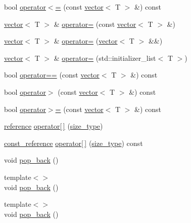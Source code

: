 \begin{DoxyCompactItemize}
\item 
bool \mbox{\hyperlink{classvector_a760a0ad79cdf6a459e2641ddb9a54c3a}{operator$<$=}} (const \mbox{\hyperlink{classvector}{vector}}$<$ T $>$ \&) const
\item 
\mbox{\hyperlink{classvector}{vector}}$<$ T $>$ \& \mbox{\hyperlink{classvector_ab0f8c3adc54f26c30db3a913daed81af}{operator=}} (const \mbox{\hyperlink{classvector}{vector}}$<$ T $>$ \&)
\item 
\mbox{\hyperlink{classvector}{vector}}$<$ T $>$ \& \mbox{\hyperlink{classvector_aa2bf38f1f948638605444ce95d16a663}{operator=}} (\mbox{\hyperlink{classvector}{vector}}$<$ T $>$ \&\&)
\item 
\mbox{\hyperlink{classvector}{vector}}$<$ T $>$ \& \mbox{\hyperlink{classvector_a5f6769205da0b796713428b1459e327c}{operator=}} (std\+::initializer\+\_\+list$<$ T $>$)
\item 
bool \mbox{\hyperlink{classvector_a88f9c524540044b38f3764402630ae1a}{operator==}} (const \mbox{\hyperlink{classvector}{vector}}$<$ T $>$ \&) const
\item 
bool \mbox{\hyperlink{classvector_a37d3ca28d74899424961724b24c0f3a2}{operator$>$}} (const \mbox{\hyperlink{classvector}{vector}}$<$ T $>$ \&) const
\item 
bool \mbox{\hyperlink{classvector_ade0789b28bfb75812bbf1ad6ef4597dc}{operator$>$=}} (const \mbox{\hyperlink{classvector}{vector}}$<$ T $>$ \&) const
\item 
\mbox{\hyperlink{classvector_a9b1a63f171d76a7a3995b6858e99f2ea}{reference}} \mbox{\hyperlink{classvector_a8493ee7c3c651b0b03afdbe047096a91}{operator\mbox{[}$\,$\mbox{]}}} (\mbox{\hyperlink{classvector_ada51e68d31936547d3729c82daf6b7c6}{size\+\_\+type}})
\item 
\mbox{\hyperlink{classvector_af9ba3e25df088c62f7d535b91672cda9}{const\+\_\+reference}} \mbox{\hyperlink{classvector_a846e6cb5a46fb5efef36f5b8be2bb589}{operator\mbox{[}$\,$\mbox{]}}} (\mbox{\hyperlink{classvector_ada51e68d31936547d3729c82daf6b7c6}{size\+\_\+type}}) const
\item 
void \mbox{\hyperlink{classvector_a058bda4957df6a97b1ea6c9fd783f672}{pop\+\_\+back}} ()
\item 
{\footnotesize template$<$$>$ }\\void \mbox{\hyperlink{classvector_ad8894ea792178c89c0e39927c8feddea}{pop\+\_\+back}} ()
\item 
{\footnotesize template$<$$>$ }\\void \mbox{\hyperlink{classvector_ad8894ea792178c89c0e39927c8feddea}{pop\+\_\+back}} ()

\end{DoxyCompactItemize}
